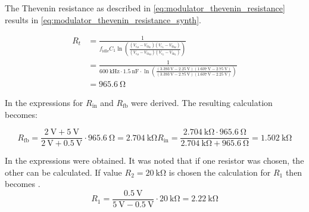 The Thevenin resistance as described in \autoref{eq:modulator_thevenin_resistance} results in \autoref{eq:modulator_thevenin_resistance_synth}.

\begin{equation} \label{eq:modulator_thevenin_resistance_synth}
	\begin{split}
		R_{t} &= \frac{1}{f_{\mathrm{idle}} C_{1} \ln{ \left( \frac{(V_{c_{H}} - V_{\mathrm{th}_{L}})(V_{c_{L}} - V_{\mathrm{th}_{H}})}{(V_{c_{H}} - V_{\mathrm{th}_{H}})(V_{c_{L}} - V_{\mathrm{th}_{L}})} \right) }} \\
		&= \frac{1}{\SI{600}{\kilo\hertz} \cdot \SI{1.5}{\nano\farad} \cdot \ln{ \left( \frac{(\SI{3.393}{\volt} - \SI{2.25}{\volt})(\SI{1.607}{\volt} - \SI{2.75}{\volt})}{(\SI{3.393}{\volt} - \SI{2.75}{\volt})(\SI{1.607}{\volt} - \SI{2.25}{\volt})} \right) }} \\
		&= \SI{965.6}{\ohm}
	\end{split}
\end{equation}

In  the expressions for $R_{\mathrm{in}}$ and $R_{\mathrm{fb}}$ were derived. The resulting calculation becomes:

\begin{subequations} \label{eq:modulator_rfb_rin_synth}
	\begin{equation} \label{eq:modulator_rfb_rin_synth_a}
		R_{\mathrm{fb}} = \frac{\SI{2}{\volt} + \SI{5}{\volt}}{\SI{2}{\volt} + \SI{0.5}{\volt}} \cdot \SI{965.6}{\ohm} = \SI{2.704}{\kilo\ohm}
	\end{equation}
	\begin{equation} \label{eq:modulator_rfb_rin_synth_b}
		R_{\mathrm{in}} = \frac{\SI{2.704}{\kilo\ohm} \cdot \SI{965.6}{\ohm}}{\SI{2.704}{\kilo\ohm} + \SI{965.6}{\ohm}} = \SI{1.502}{\kilo\ohm}
	\end{equation}
\end{subequations}

In  the expressions were obtained. It was noted that if one resistor was chosen, the other can be calculated. If value $R_{2} = \SI{20}{\kilo\ohm}$ is chosen the calculation for $R_{1}$ then becomes .
\begin{equation} \label{eq:modulator_aim_resistor_synth}
	R_{1} = \frac{\SI{0.5}{\volt}}{\SI{5}{\volt} - \SI{0.5}{\volt}} \cdot \SI{20}{\kilo\ohm} = \SI{2.22}{\kilo\ohm}
\end{equation}

